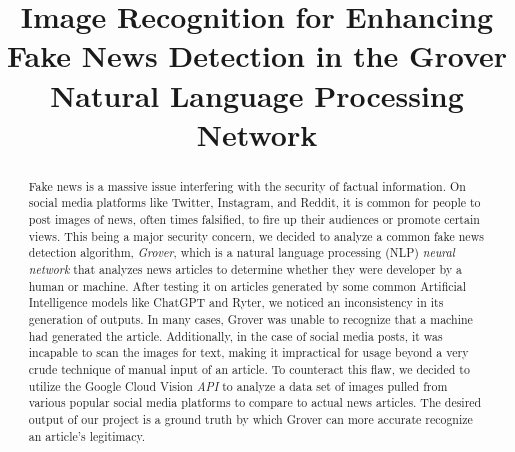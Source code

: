 \documentclass[conference]{IEEEtran}
\begin{document}
\title{Image Recognition for Enhancing Fake News Detection in the Grover Natural Language Processing Network\\
}

\author{
\and
{}
\and
{}
\and
{}
\and
{}
}
\maketitle

\begin{abstract}
Fake news is a massive issue interfering with the security of factual information. On social media platforms like Twitter, Instagram, and Reddit, it is common for people to post images of news, often times falsified, to fire up their audiences or promote certain views. This being a major security concern, we decided to analyze a common fake news detection algorithm, \emph{Grover}, which is a natural language processing (NLP) \emph{neural network} that analyzes news articles to determine whether they were developer by a human or machine. After testing it on articles generated by some common Artificial Intelligence models like ChatGPT and Ryter, we noticed an inconsistency in its generation of outputs. In many cases, Grover was unable to recognize that a machine had generated the article. Additionally, in the case of social media posts, it was incapable to scan the images for text, making it impractical for usage beyond a very crude technique of manual input of an article. To counteract this flaw, we decided to utilize the Google Cloud Vision \emph{API} to analyze a data set of images pulled from various popular social media platforms to compare to actual news articles. The desired output of our project is a ground truth by which Grover can more accurate recognize an article's legitimacy. 
\end{abstract}
\end{document}
